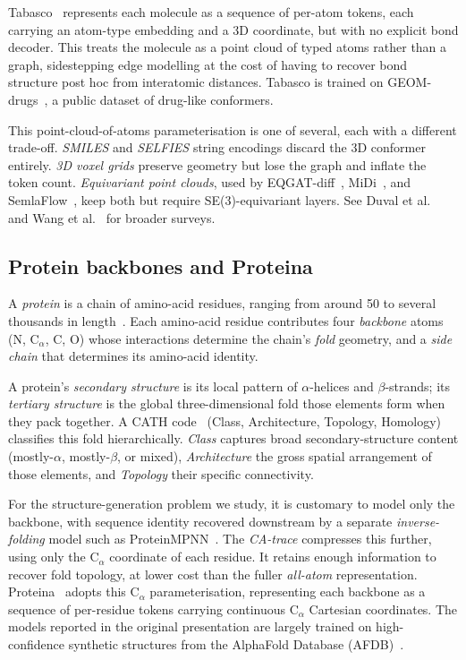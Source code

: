 \documentclass[12pt,a4paper,twoside]{report}
\begin{document}
Tabasco~\cite{Tabasco} represents each molecule as a sequence of per-atom tokens, each carrying an atom-type embedding and a 3D coordinate, but with no explicit bond decoder. This treats the molecule as a point cloud of typed atoms rather than a graph, sidestepping edge modelling at the cost of having to recover bond structure post hoc from interatomic distances. Tabasco is trained on GEOM-drugs~\cite{GEOMdrugs}, a public dataset of drug-like conformers.

This point-cloud-of-atoms parameterisation is one of several, each with a different trade-off. \emph{SMILES} and \emph{SELFIES} string encodings discard the 3D conformer entirely. \emph{3D voxel grids} preserve geometry but lose the graph and inflate the token count. \emph{Equivariant point clouds}, used by EQGAT-diff~\cite{EQGATdiff}, MiDi~\cite{MiDi}, and SemlaFlow~\cite{SemlaFlow}, keep both but require SE(3)-equivariant layers. See Duval et al.~\cite{HitchhikersGuide} and Wang et al.~\cite{MoleculeDiffusionSurvey} for broader surveys.
\subsection{Protein backbones and Proteina}
\label{sec:protein}

A \emph{protein} is a chain of amino-acid residues, ranging from around 50 to several thousands in length~\cite{BritannicaProtein}. Each amino-acid residue contributes four \emph{backbone} atoms (N, C$_\alpha$, C, O) whose interactions determine the chain's \emph{fold} geometry, and a \emph{side chain} that determines its amino-acid identity.

A protein's \emph{secondary structure} is its local pattern of $\alpha$-helices and $\beta$-strands; its \emph{tertiary structure} is the global three-dimensional fold those elements form when they pack together. A CATH code~\cite{CATH} (Class, Architecture, Topology, Homology) classifies this fold hierarchically. \emph{Class} captures broad secondary-structure content (mostly-$\alpha$, mostly-$\beta$, or mixed), \emph{Architecture} the gross spatial arrangement of those elements, and \emph{Topology} their specific connectivity.

For the structure-generation problem we study, it is customary to model only the backbone, with sequence identity recovered downstream by a separate \emph{inverse-folding} model such as ProteinMPNN~\cite{ProteinMPNN}. The \emph{CA-trace} compresses this further, using only the C$_\alpha$ coordinate of each residue. It retains enough information to recover fold topology, at lower cost than the fuller \emph{all-atom} representation. Proteina~\cite{Proteina} adopts this C$_\alpha$ parameterisation, representing each backbone as a sequence of per-residue tokens carrying continuous C$_\alpha$ Cartesian coordinates. The models reported in the original presentation are largely trained on high-confidence synthetic structures from the AlphaFold Database (AFDB)~\cite{AFDB}.
\end{document}
